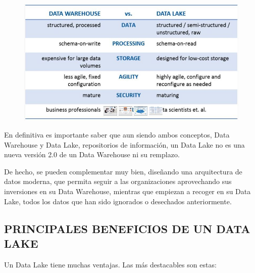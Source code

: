 \documentclass[preprint,12pt]{elsarticle}
\begin{document}
\begin{figure}[htb]
				\begin{center}
					\includegraphics[width=15cm]{./IMAGENES/fiorella3}
				\end{center}
			\end{figure}
En definitiva es importante saber que aun siendo ambos conceptos, Data Warehouse y Data Lake, repositorios de información, un Data Lake no es una nueva versión 2.0 de un Data Warehouse ni su remplazo.

De hecho, se pueden complementar muy bien, diseñando una arquitectura de datos moderna, que permita seguir a las organizaciones aprovechando sus inversiones en su Data Warehouse, mientras que empiezan a recoger en su Data Lake, todos los datos que han sido ignorados o desechados anteriormente.

\subsection{PRINCIPALES BENEFICIOS DE UN DATA LAKE}	


Un Data Lake tiene muchas ventajas. Las más destacables son estas:
\end{document}
